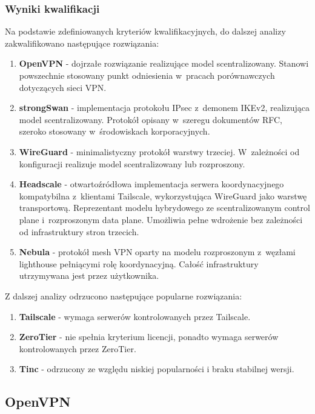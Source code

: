 \newpage

\subsubsection{Wyniki kwalifikacji}

Na podstawie zdefiniowanych kryteriów kwalifikacyjnych, do dalszej analizy zakwalifikowano następujące rozwiązania:

\begin{enumerate}[leftmargin=*]
    \item \textbf{OpenVPN} - dojrzałe rozwiązanie realizujące model scentralizowany. Stanowi powszechnie stosowany punkt odniesienia w~pracach porównawczych dotyczących sieci VPN.
    \item \textbf{strongSwan} - implementacja protokołu IPsec z~demonem IKEv2, realizująca model scentralizowany. Protokół opisany w~szeregu dokumentów RFC, szeroko stosowany w~środowiskach korporacyjnych.
    \item \textbf{WireGuard} - minimalistyczny protokół warstwy trzeciej. W~zależności od konfiguracji realizuje model scentralizowany lub rozproszony.
    \item \textbf{Headscale} - otwartoźródłowa implementacja serwera koordynacyjnego kompatybilna z~klientami Tailscale, wykorzystująca WireGuard jako warstwę transportową. Reprezentant modelu hybrydowego ze scentralizowanym control plane i~rozproszonym data plane. Umożliwia pełne wdrożenie bez zależności od infrastruktury stron trzecich.
    \item \textbf{Nebula} - protokół mesh VPN oparty na modelu rozproszonym z~węzłami lighthouse pełniącymi rolę koordynacyjną. Całość infrastruktury utrzymywana jest przez użytkownika.
\end{enumerate}

Z dalszej analizy odrzucono następujące popularne rozwiązania:

\begin{enumerate}[leftmargin=*]
    \item \textbf{Tailscale} - wymaga serwerów kontrolowanych przez Tailscale.
    \item \textbf{ZeroTier} - nie spełnia kryterium licencji, ponadto wymaga serwerów kontrolowanych przez ZeroTier.
    \item \textbf{Tinc} - odrzucony ze względu niskiej popularności i braku stabilnej wersji.
\end{enumerate}

\newpage
\subsection{OpenVPN}

